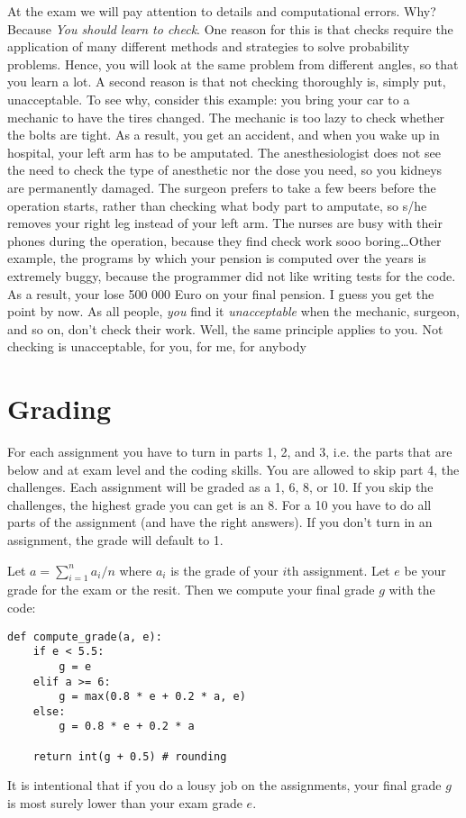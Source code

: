 \documentclass[a4paper]{article}
\theoremstyle{definition}
\newcommand{\1}[1]{\,I_{#1}} %
\begin{document}
At the exam we will pay attention to details and computational errors. Why? Because \emph{You should learn to check}.
One reason for this is that checks require the application of many different methods and strategies to solve probability problems.
Hence, you will look at the same problem from different angles, so that you learn a lot.
A second reason is that not checking thoroughly is, simply put, unacceptable. 
To see why, consider this example:  you bring your car to a mechanic to have the tires changed.
The mechanic is too lazy to check whether the bolts are tight.
As a result, you get an accident, and when you wake up in hospital, your left arm has to be amputated.
The anesthesiologist does not see the need to check the type of anesthetic nor the dose you need, so you kidneys are permanently damaged.
The surgeon prefers to take a few beers before the operation starts, rather than checking what body part to amputate, so s/he removes your right leg instead of your left arm.
The nurses are busy with their phones during the operation, because they find check work sooo boring\ldots Other example, the programs by which your pension is computed over the years is extremely buggy, because the programmer did not like writing tests for the code.
As a result, your lose 500 000 Euro on your final pension.
I guess you get the point by now.
As all people, \emph{you} find it \emph{unacceptable} when the mechanic, surgeon, and so on, don't check their work.
Well, the same principle applies to you.
Not checking is unacceptable, for you, for me, for anybody




\section{Grading}
\label{sec:orgaf57bca}

For each assignment you  have to turn in  parts 1, 2, and 3, i.e. the parts  that are below and at exam level and the coding skills. You are allowed to skip part 4, the challenges. 
Each assignment will be graded as a 1, 6, 8, or 10.
If you skip the challenges, the highest grade you can get is an 8.
For a 10 you have to do all parts of the assignment (and have the right answers). 
If you don't turn in an assignment, the grade will default to 1.


Let \(a=\sum_{i=1}^n a_{i}/n\) where \(a_i\) is the grade of your  \(i\)th assignment.
Let \(e\) be your grade for the exam or the resit.
Then we compute your final grade \(g\) with the code:
\begin{verbatim}
def compute_grade(a, e):
    if e < 5.5:
        g = e
    elif a >= 6:
        g = max(0.8 * e + 0.2 * a, e)
    else:
        g = 0.8 * e + 0.2 * a

    return int(g + 0.5) # rounding
\end{verbatim}
It is intentional that if you do a lousy job on the assignments, your final grade \(g\) is most surely lower than your exam grade \(e\).
\end{document}
